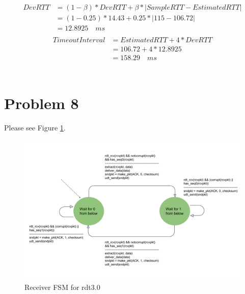 \documentclass[titlepage, paper=a4, fontsize=11pt]{scrartcl} %
\numberwithin{equation}{section} %
\numberwithin{table}{section} %
\begin{document}
\begin{align*} 
\begin{split}
DevRTT &= (1-\beta)*DevRTT + \beta * | SampleRTT - EstimatedRTT | \\
&= (1-0.25)*14.43 + 0.25 * | 115 - 106.72 | \\
&= 12.8925 \quad ms
\end{split}					
\end{align*}
\begin{align*} 
\begin{split}
TimeoutInterval &= EstimatedRTT + 4*DevRTT \\
&= 106.72 + 4*12.8925 \\
&= 158.29 \quad ms
\end{split}					
\end{align*}
\\


\section*{Problem 8}
Please see Figure \ref{fig:rdt3}.
\begin{figure}[!ht]
    \includegraphics[width=\textwidth]{images/rdt3-rcv-FSM.pdf}
    \caption{Receiver FSM for rdt3.0}
    \label{fig:rdt3}
\end{figure}



\end{document}

